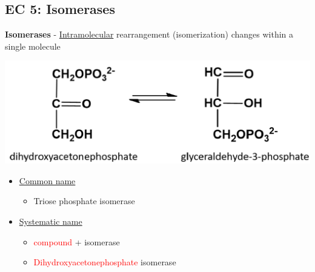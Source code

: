 \documentclass[10pt]{article}
\begin{document}
\subsection*{EC 5: Isomerases}
\textbf{Isomerases} - \underline{Intramolecular} rearrangement (isomerization) changes within a single molecule
\begin{center}
    \includegraphics*[width=\textwidth]{L2_7.png} 
\end{center}
\begin{itemize}
    \item \underline{Common name}
    \begin{itemize}
        \item Triose phosphate isomerase
    \end{itemize}
    \item \underline{Systematic name}
    \begin{itemize}
        \item \textcolor{red}{compound} + isomerase
        \item \textcolor{red}{Dihydroxyacetonephosphate} isomerase
    \end{itemize}
\end{itemize}
\end{document}
